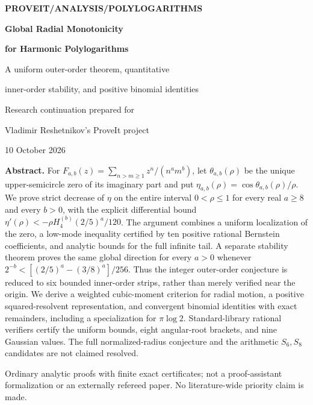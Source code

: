 \documentclass[11pt,letterpaper]{article}
\numberwithin{equation}{section}
\theoremstyle{definition}
\theoremstyle{remark}
\begin{document}
\begin{titlepage}
\setlength{\parindent}{0pt}
\thispagestyle{empty}
{\small\sffamily\bfseries PROVEIT\quad /\quad ANALYSIS\quad /\quad POLYLOGARITHMS\par}
\vspace{17mm}
{\Huge\bfseries Global Radial Monotonicity\par}
\vspace{3mm}
{\Huge\bfseries for Harmonic Polylogarithms\par}
\vspace{8mm}
{\Large A uniform outer-order theorem, quantitative\par
inner-order stability, and positive binomial identities\par}
\vspace{13mm}
{\large Research continuation prepared for\par
Vladimir Reshetnikov's ProveIt project\par}
\vspace{4mm}
{10 October 2026\par}
\vspace{12mm}
\begin{minipage}{\textwidth}
\textbf{Abstract.}
For $F_{a,b}(z)=\sum_{n>m\ge1}z^n/(n^a m^b)$, let
$\theta_{a,b}(\rho)$ be the unique upper-semicircle zero of its imaginary
part and put $\eta_{a,b}(\rho)=\cos\theta_{a,b}(\rho)/\rho$.
We prove strict decrease of $\eta$ on the entire interval $0<\rho\le1$
for every real $a\ge8$ and every $b>0$, with the explicit differential
bound $\eta'(\rho)<-\rho H_4^{(b)}(2/5)^a/120$.
The argument combines a uniform localization of the zero, a low-mode
inequality certified by ten positive rational Bernstein coefficients,
and analytic bounds for the full infinite tail.
A separate stability theorem proves the same global direction for every
$a>0$ whenever $2^{-b}<[(2/5)^a-(3/8)^a]/256$.
Thus the integer outer-order conjecture is reduced to six bounded
inner-order strips, rather than merely verified near the origin.
We derive a weighted cubic-moment criterion for radial motion, a
positive squared-resolvent representation, and convergent binomial
identities with exact remainders, including a specialization for
$\pi\log2$. Standard-library rational verifiers certify the uniform
bounds, eight angular-root brackets, and nine Gaussian values.
The full normalized-radius conjecture and the arithmetic $S_6,S_8$
candidates are not claimed resolved.
\end{minipage}
\vfill
{\small Ordinary analytic proofs with finite exact certificates; not a proof-assistant
formalization or an externally refereed paper. No literature-wide priority claim is made.\par}
\end{titlepage}
\begingroup
\small
\setlength{\parskip}{0pt}
\tableofcontents
\endgroup
\newpage
\end{document}
